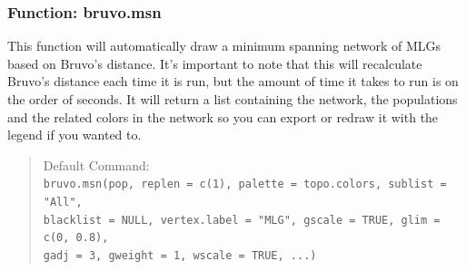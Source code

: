 \documentclass[letterpaper]{article}
\newcommand{\tab}{\hspace*{1em}}
\begin{document}
\subsubsection{Function: bruvo.msn}\label{index:trees:bruvo.msn}
\tab\tab This function will automatically draw a minimum spanning network of MLGs based on Bruvo's distance. It's important to note that this will recalculate Bruvo's distance each time it is run, but the amount of time it takes to run is on the order of seconds. It will return a list containing the network, the populations and the related colors in the network so you can export or redraw it with the legend if you wanted to.
\begin{quote}
Default Command:\\
\texttt{bruvo.msn(pop, replen = c(1), palette = topo.colors, sublist = "All",\\ 
  \tab blacklist = NULL, vertex.label = "MLG", gscale = TRUE, glim = c(0, 0.8),\\ 
  \tab gadj = 3, gweight = 1, wscale = TRUE, ...)
}
\end{quote}
\end{document}
